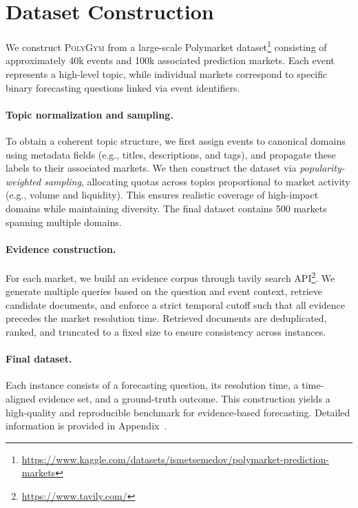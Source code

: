 \documentclass[11pt]{article}
\theoremstyle{definition}          %
\begin{document}
\section{Dataset Construction}
We construct \textsc{PolyGym} from a large-scale Polymarket dataset\footnote{\url{https://www.kaggle.com/datasets/ismetsemedov/polymarket-prediction-markets}} consisting of approximately 40k events and 100k associated prediction markets.
Each event represents a high-level topic, while individual markets correspond to specific binary forecasting questions linked via event identifiers.

\paragraph{Topic normalization and sampling.}
To obtain a coherent topic structure, we first assign events to canonical domains using metadata fields (e.g., titles, descriptions, and tags), and propagate these labels to their associated markets.
We then construct the dataset via \emph{popularity-weighted sampling}, allocating quotas across topics proportional to market activity (e.g., volume and liquidity).
This ensures realistic coverage of high-impact domains while maintaining diversity.
The final dataset contains 500 markets spanning multiple domains.

\paragraph{Evidence construction.}
For each market, we build an evidence corpus through tavily search API\footnote{\url{https://www.tavily.com/}}.
We generate multiple queries based on the question and event context, retrieve candidate documents, and enforce a strict temporal cutoff such that all evidence precedes the market resolution time.
Retrieved documents are deduplicated, ranked, and truncated to a fixed size to ensure consistency across instances.

\paragraph{Final dataset.}
Each instance consists of a forecasting question, its resolution time, a time-aligned evidence set, and a ground-truth outcome.
This construction yields a high-quality and reproducible benchmark for evidence-based forecasting.
Detailed information is provided in Appendix~.
\end{document}
